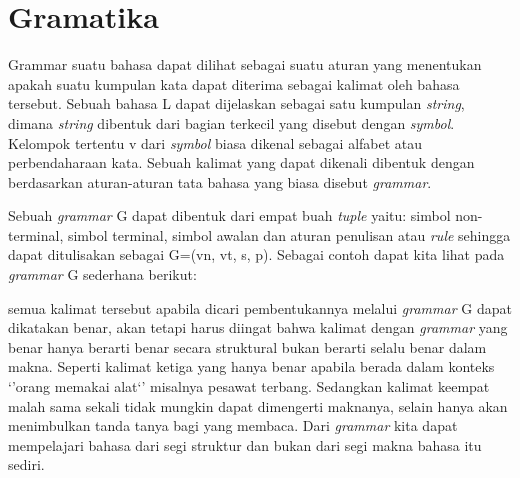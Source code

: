 \section{Gramatika}
Grammar suatu bahasa dapat dilihat sebagai suatu aturan yang menentukan apakah suatu kumpulan kata dapat diterima sebagai kalimat oleh bahasa tersebut. Sebuah bahasa L dapat dijelaskan sebagai satu kumpulan \emph{string}, dimana \emph{string} dibentuk dari bagian terkecil yang disebut dengan \emph{symbol}. Kelompok tertentu v dari \emph{symbol} biasa dikenal sebagai alfabet atau perbendaharaan kata. Sebuah kalimat yang dapat dikenali dibentuk dengan berdasarkan aturan-aturan tata bahasa yang biasa disebut \emph{grammar}.

Sebuah \emph{grammar} G dapat dibentuk dari empat buah \emph{tuple} yaitu: simbol non-terminal, simbol terminal, simbol awalan dan aturan penulisan atau \emph{rule} sehingga dapat ditulisakan sebagai G=(vn, vt, s, p). Sebagai contoh dapat kita lihat pada \emph{grammar} G sederhana berikut:
\begin{figure}[grammar_1]

\end{figure}
semua kalimat tersebut apabila dicari pembentukannya melalui \emph{grammar} G dapat dikatakan benar, akan tetapi harus diingat bahwa kalimat dengan \emph{grammar} yang benar hanya berarti benar secara struktural bukan berarti selalu benar dalam makna. Seperti kalimat ketiga yang hanya benar apabila berada dalam konteks `'orang memakai alat`' misalnya pesawat terbang. Sedangkan kalimat keempat malah sama sekali tidak mungkin dapat dimengerti maknanya, selain hanya akan menimbulkan tanda tanya bagi yang membaca. Dari \emph{grammar} kita dapat mempelajari bahasa dari segi struktur dan bukan dari segi makna bahasa itu sediri.

